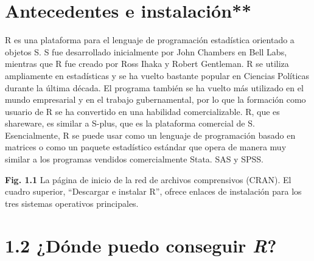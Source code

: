 \documentclass[
]{book}
\begin{document}
\hypertarget{antecedentes-e-instalaciuxf3n}{%
\section*{Antecedentes e instalación**}\label{antecedentes-e-instalaciuxf3n}}

R es una plataforma para el lenguaje de programación estadística orientado a objetos S. S fue desarrollado inicialmente por John Chambers en Bell Labs, mientras que R fue creado por Ross Ihaka y Robert Gentleman. R se utiliza ampliamente en estadísticas y se ha vuelto bastante popular en Ciencias Políticas durante la última década. El programa también se ha vuelto más utilizado en el mundo empresarial y en el trabajo gubernamental, por lo que la formación como usuario de R se ha convertido en una habilidad comercializable. R, que es shareware, es similar a S-plus, que es la plataforma comercial de S. Esencialmente, R se puede usar como un lenguaje de programación basado en matrices o como un paquete estadístico estándar que opera de manera muy similar a los programas vendidos comercialmente Stata. SAS y SPSS.

\textbf{Fig. 1.1} La página de inicio de la red de archivos comprensivos (CRAN). El cuadro superior, ``Descargar e instalar R'', ofrece enlaces de instalación para los tres sistemas operativos principales.

\hypertarget{duxf3nde-puedo-conseguir-r}{%
\section*{\texorpdfstring{\textbf{1.2 ¿Dónde puedo conseguir \emph{R}?}}{1.2 ¿Dónde puedo conseguir R?}}\label{duxf3nde-puedo-conseguir-r}}
\end{document}

